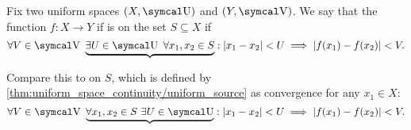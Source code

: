 \begin{definition}\label{def:uniform_continuity}\cite[435]{Engelking1989}
  Fix two uniform spaces \( (X, \CU) \) and \( (Y, \CV) \). We say that the function \( f: X \to Y \) if is  on the set \( S \subseteq X \) if
  \begin{equation}\label{def:uniform_continuity/uniform}
    \forall V \in \CV \ \underbrace{\exists U \in \CU \ \forall x_1, x_2 \in S} : \Abs{x_1 - x_2} < U \implies \Abs{f(x_1) - f(x_2)} < V.
  \end{equation}

  Compare this to  on \( S \), which is defined by \cref{thm:uniform_space_continuity/uniform_source} as convergence for any \( x_1 \in X \):
  \begin{equation}\label{def:uniform_continuity/pointwise}
    \forall V \in \CV \ \underbrace{\forall x_1, x_2 \in S \ \exists U \in \CU} : \Abs{x_1 - x_2} < U \implies \Abs{f(x_1) - f(x_2)} < V.
  \end{equation}
\end{definition}

